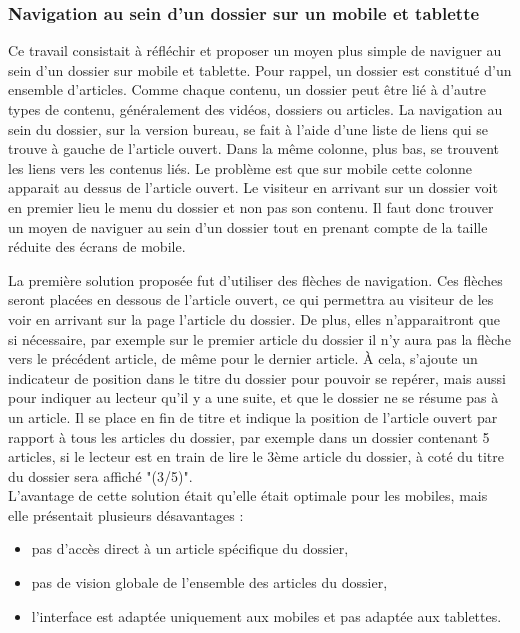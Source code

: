 \documentclass[12pt,a4paper]{article}
\begin{document}
\subsubsection{Navigation au sein d'un dossier sur un mobile et tablette}
Ce travail consistait à réfléchir et proposer un moyen plus simple de naviguer au sein d'un dossier sur mobile et tablette. Pour rappel, un dossier est constitué d'un ensemble d'articles. Comme chaque contenu, un dossier peut être lié à d'autre types de contenu, généralement des vidéos, dossiers ou articles. La navigation au sein du dossier, sur la version bureau, se fait à l'aide d'une liste de liens qui se trouve à gauche de l'article ouvert. Dans la même colonne, plus bas, se trouvent les liens vers les contenus liés. Le problème est que sur mobile cette colonne apparait au dessus de l'article ouvert. Le visiteur en arrivant sur un dossier voit en premier lieu le menu du dossier et non pas son contenu. Il faut donc trouver un moyen de naviguer au sein d'un dossier tout en prenant compte de la taille réduite des écrans de mobile.\par
La première solution proposée fut d'utiliser des flèches de navigation. Ces flèches seront placées en dessous de l'article ouvert, ce qui permettra au visiteur de les voir en arrivant sur la page l'article du dossier. De plus, elles n'apparaitront que si nécessaire, par exemple sur le premier article du dossier il n'y aura pas la flèche vers le précédent article, de même pour le dernier article. À cela, s'ajoute un indicateur de position dans le titre du dossier pour pouvoir se repérer, mais aussi pour indiquer au lecteur qu'il y a une suite, et que le dossier ne se résume pas à un article. Il se place en fin de titre et indique la position de l'article ouvert par rapport à tous les articles du dossier, par exemple dans un dossier contenant 5 articles, si le lecteur est en train de lire le 3ème article du dossier, à coté du titre du dossier sera affiché "(3/5)".\\
L'avantage de cette solution était qu'elle était optimale pour les mobiles, mais elle présentait plusieurs désavantages :
\begin{itemize}
\item pas d'accès direct à un article spécifique du dossier,
\item pas de vision globale de l'ensemble des articles du dossier,
\item l'interface est adaptée uniquement aux mobiles et pas adaptée aux tablettes.
\end{itemize}\par
\end{document}
